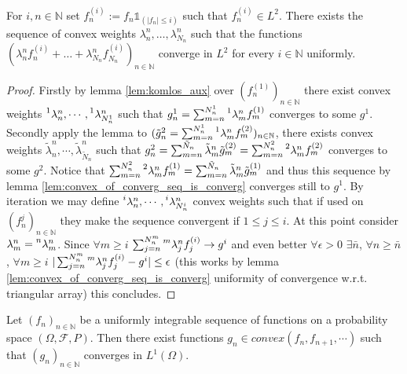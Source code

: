\begin{lemma}\label{lem:komlos_convex_aux}
  For $i,n\in\mathbb{N}$ set $f_{n}^{(i)}:=f_n \mathbb{1}_{(|f_n|\leq i)}$ such that $f_{n}^{(i)}\in L^2$.
  There exists the sequence of convex weights $\lambda_n^{n}, \ldots, \lambda_{N_n}^{n}$ such that the functions
  $ (\lambda_n^{n} f_n^{(i)} + \ldots+\lambda_{N_n}^{n} f_{N_n}^{(i)})_{n\in\mathbb{N}}$
  converge in $L^2$ for every $i\in\mathbb{N}$ uniformly.
\end{lemma}

\begin{proof}
  Firstly by lemma \ref{lem:komlos_aux} over $(f_n^{(1)})_{n\in\mathbb{N}}$ there exist convex weights $\prescript{1}{}{\lambda}^n_n,\cdots,\prescript{1}{}{\lambda}^n_{N^1_n}$ such that
  $g^1_n=\sum_{m=n}^{N^1_n}\prescript{1}{}{\lambda}^n_mf_m^{(1)}$ converges to some $g^1$.
  Secondly apply the lemma to $(\tilde{g}^2_n=\sum_{m=n}^{N^1_n}\prescript{1}{}{\lambda}^n_mf^{(2)}_m)_{n\in\mathbb{N}}$, there exists convex weights $\tilde{\lambda}^n_n,\cdots,\tilde{\lambda}^n_{\tilde{N}_n}$ such that
  $g^2_n=\sum_{m=n}^{\tilde{N}_n}\tilde{\lambda}^n_m\tilde{g}_m^{(2)}=\sum_{m=n}^{N^2_n}\prescript{2}{}{\lambda}^n_mf_m^{(2)}$ converges to some $g^2$.
  Notice that $\sum_{m=n}^{N^2_n}\prescript{2}{}{\lambda}^n_mf_m^{(1)}=\sum_{m=n}^{\tilde{N}_n}\tilde{\lambda}^n_m\tilde{g}_m^{(1)}$ and thus this sequence by lemma \ref{lem:convex_of_converg_seq_is_converg} converges still to $g^1$.
  By iteration we may define $\prescript{i}{}{\lambda}^n_n,\cdots,\prescript{i}{}{\lambda}^n_{N^i_n}$ convex weights such that if used on $(f^j_n)_{n\in\mathbb{N}}$ they make the sequence convergent if $1\leq j\leq i$.
  At this point consider $\lambda^n_m=\prescript{n}{}{\lambda}^n_m$.
  Since $\forall m\geq i$ $\sum_{j=n}^{N^m_n}\prescript{m}{}{\lambda}^n_j f^{(i)}_j\rightarrow g^i$ and even better
  $\forall\epsilon>0$ $\exists\bar{n}$, $\forall n\geq\bar{n}$, $\forall m\geq i$ $|\sum_{j=n}^{N^m_n}\prescript{m}{}{\lambda}^n_j f^{(i)}_j - g^i|\leq\epsilon$
  (this works by lemma \ref{lem:convex_of_converg_seq_is_converg} uniformity of convergence w.r.t. triangular array) this concludes.
\end{proof}


\begin{lemma}\label{lem:komlos}
  Let $( f_n)_{n\in\mathbb{N}}$ be a uniformly integrable sequence of functions on a probability space $(\Omega , \mathcal{F} , P)$.
  Then there exist functions $g_n \in convex( f_n, f_{n+1}, \cdots)$ such that $(g_n)_{n\in\mathbb{N}}$ converges in  $L^1 (\Omega )$.
\end{lemma}

